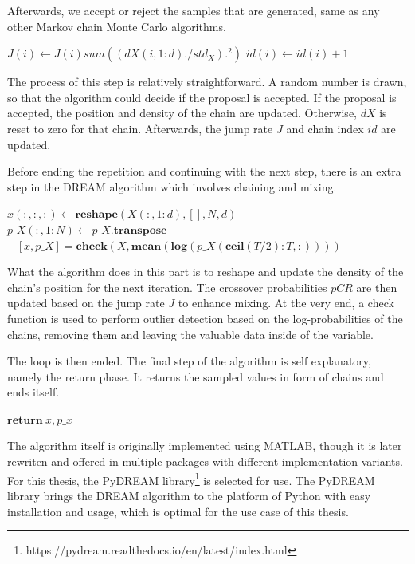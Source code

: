 Afterwards, we accept or reject the samples that are generated, same as any other Markov chain Monte Carlo algorithms.

\begin{algorithm}[H]
$J(i) \gets J(i) sum((dX(i, 1:d) ./ std_X).^2)$
$id(i) \gets id(i) + 1$
\end{algorithm}

The process of this step is relatively straightforward. A random number is drawn, so that the algorithm could decide if the proposal is accepted. If the proposal is accepted, the position and density of the chain are updated. Otherwise, $dX$ is reset to zero for that chain. Afterwards, the jump rate $J$ and chain index $id$ are updated.

Before ending the repetition and continuing with the next step, there is an extra step in the DREAM algorithm which involves chaining and mixing.

\begin{algorithm}[H]
$x(:, :, :) \gets \textbf{reshape}(X(:, 1:d), [], N, d)$\\
$p\_X(:, 1:N) \gets p\_X.\textbf{transpose}$\\\
$[x, p\_X] = \textbf{check}(X, \textbf{mean}(\textbf{log}(p\_X(\textbf{ceil}(T/2):T, :))))$
\end{algorithm}
What the algorithm does in this part is to reshape and update the density of the chain's position for the next iteration. The crossover probabilities $pCR$ are then updated based on the jump rate $J$ to enhance mixing. At the very end, a check function is used to perform outlier detection based on the log-probabilities of the chains, removing them and leaving the valuable data inside of the variable.

The loop is then ended. The final step of the algorithm is self explanatory, namely the return phase. It returns the sampled values in form of chains and ends itself.
\begin{algorithm}
    $\textbf{return}\  x, p\_x$
\end{algorithm}

The algorithm itself is originally implemented using MATLAB, though it is later rewriten and offered in multiple packages with different implementation variants. For this thesis, the PyDREAM library\footnote{https://pydream.readthedocs.io/en/latest/index.html} is selected for use. The PyDREAM library brings the DREAM algorithm to the platform of Python with easy installation and usage,\cite{pydream} which is optimal for the use case of this thesis.

